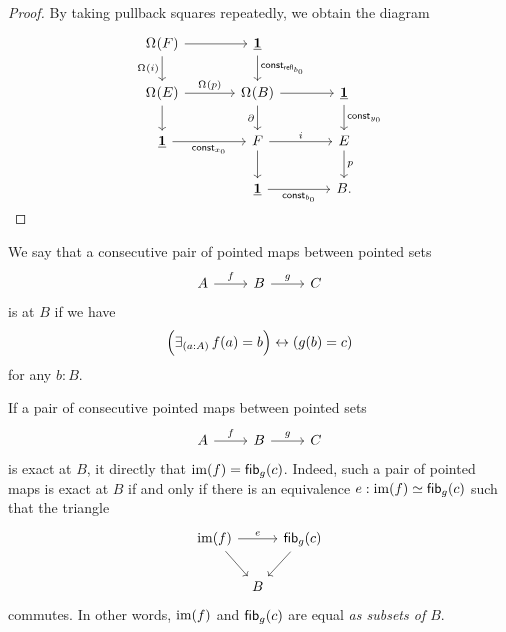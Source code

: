\begin{proof}
By taking pullback squares repeatedly, we obtain the diagram
\begin{equation*}
\begin{gathered}[b]
\begin{tikzcd}[column sep=large]
\loopspace{F} \arrow[d,swap,"\loopspace{i}"] \arrow[r] & \unit \arrow[d,"\mathsf{const}_{\refl{b_0}}"] \\
\loopspace{E} \arrow[r,"\loopspace{p}"] \arrow[d] & \loopspace{B} \arrow[r] \arrow[d,swap,"\partial"] & \unit \arrow[d,"\mathsf{const}_{y_0}"] \\
\unit \arrow[r,swap,"\mathsf{const}_{x_0}"] & F \arrow[r,"i"] \arrow[d] & E \arrow[d,"p"] \\
& \unit \arrow[r,swap,"\mathsf{const}_{b_0}"] & B.
\end{tikzcd}\\[-\dp\strutbox]
\end{gathered}\qedhere
\end{equation*}
\end{proof}

\begin{defn}
We say that a consecutive pair of pointed maps between pointed sets
\begin{equation*}
\begin{tikzcd}
A \arrow[r,"f"] & B \arrow[r,"g"] & C
\end{tikzcd}
\end{equation*}
is  at $B$ if we have
\begin{equation*}
\Big(\exis{a:A}f(a)=b\Big)\leftrightarrow (g(b)=c)
\end{equation*}
for any $b:B$. 
\end{defn}

\begin{rmk}
If a pair of consecutive pointed maps between pointed sets
\begin{equation*}
\begin{tikzcd}
A \arrow[r,"f"] & B \arrow[r,"g"] & C
\end{tikzcd}
\end{equation*}
is exact at $B$, it directly that $\operatorname{im}(f)=\mathsf{fib}_{g}(c)$. Indeed, such a pair of pointed maps is exact at $B$ if and only if there is an equivalence $e:\operatorname{im}(f)\simeq \mathsf{fib}_{g}(c)$ such that the triangle
\begin{equation*}
\begin{tikzcd}[column sep=tiny]
\im(f) \arrow[dr] \arrow[rr,"e"] & & \fib{g}{c} \arrow[dl] \\
& B
\end{tikzcd}
\end{equation*}
commutes. In other words, $\operatorname{im}(f)$ and $\mathsf{fib}_{g}(c)$ are equal \emph{as subsets of $B$}.
\end{rmk}

